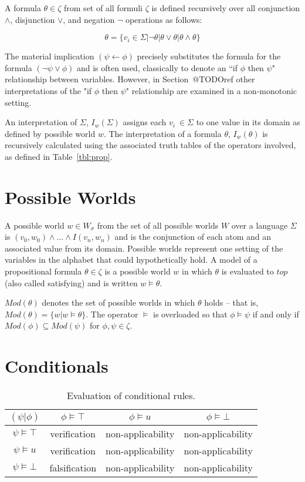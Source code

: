 A formula $\theta \in \zeta$ from set of all formuli $\zeta$ is defined recursively over all conjunction $\land$, disjunction $\lor$, and negation $\lnot$ operations as follows:

\[
\theta = \{ v_i \in \Sigma | \lnot \theta | \theta \lor \theta | \theta \land \theta \}
\]


The material implication $(\psi \leftarrow \phi)$ precisely substitutes the formula for the formula $(\lnot \psi \lor \phi)$ and is often used, classically to denote an ``if $\phi$ then $\psi$" relationship between variables. However, in Section~@TODOref other interpretations of the "if $\phi$ then $\psi$" relationship are examined in a non-monotonic setting.

An interpretation of $\Sigma$, $I_w(\Sigma)$ assigns each $v_i\ \in \Sigma$ to one value in its domain as defined by possible world $w$. The interpretation of a formula $\theta$, $I_w(\theta)$ is recursively calculated using the associated truth tables of the operators involved, as defined in Table~\ref{tbl:prop}. 

\section{Possible Worlds}
A possible world $w\in W_\sigma$ from the set of all possible worlds $W$ over a language $\Sigma$ is $(v_0,w_0) \land ... \land I(v_n,w_n)$ and is the conjunction of each atom and an associated value from its domain. Possible worlds represent one setting of the variables in the alphabet that could hypothetically hold. A model of a propositional formula $\theta \in \zeta$ is a possible world $w$ in which $\theta$ is evaluated to $top$ (also called satisfying) and is written $w \models \theta$. 

$Mod(\theta)$ denotes the set of possible worlds in which $\theta$ holds -- that is, $Mod(\theta)=\{w|w\models \theta\}$. The operator $\models$ is overloaded so that $\phi \models \psi$ if and only if $Mod(\phi) \subseteq Mod(\psi)$ for $\phi,\psi \in \zeta$.

\section{Conditionals}
\begin{table}
\begin{center}
\begin{tabular}{ c | c c c }
  $(\psi|\phi)$& $\phi\models \top$ & $\phi \models u$ & $\phi \models \bot$ \\ \hline
 $\psi\models \top$ & verification &  non-applicability & non-applicability \\  
  $\psi\models u$ & verification &  non-applicability & non-applicability \\ 
 $\psi \models \bot$ & falsification &  non-applicability & non-applicability
\end{tabular}
\caption{Evaluation of conditional rules.}
\label{tbl:cond}
\end{center}
\end{table}

